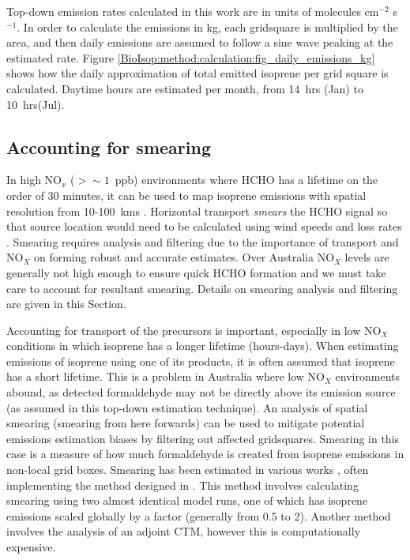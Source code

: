     Top-down emission rates calculated in this work are in units of molecules cm$^{-2}$ s$^{-1}$.
    In order to calculate the emissions in kg, each gridsquare is multiplied by the area, and then daily emissions are assumed to follow a sine wave peaking at the estimated rate.
    Figure \ref{BioIsop:method:calculation:fig_daily_emissions_kg} shows how the daily approximation of total emitted isoprene per grid square is calculated. 
    Daytime hours are estimated per month, from 14~hrs (Jan) to 10~hrs(Jul).
    
    
  
  \subsection{Accounting for smearing}
    \label{BioIsop:method:smearing}
    
    In high NO$_x$ ($ > \sim 1 $~ppb) environments where HCHO has a lifetime on the order of 30 minutes, it can be used to map isoprene emissions with spatial resolution from 10-100~kms \parencite{Palmer2003}.
    Horizontal transport \textit{smears} the HCHO signal so that source location would need to be calculated using wind speeds and loss rates \parencite{Palmer2001,Palmer2003}.
    Smearing requires analysis and filtering due to the importance of transport and NO$_X$ on forming robust and accurate estimates.
    Over Australia NO$_X$ levels are generally not high enough to ensure quick HCHO formation and we must take care to account for resultant smearing.
    Details on smearing analysis and filtering are given in this Section.
    
    Accounting for transport of the precursors is important, especially in low NO$_X$ conditions in which isoprene has a longer lifetime (hours-days).
    When estimating emissions of isoprene using one of its products, it is often assumed that isoprene has a short lifetime.
    This is a problem in Australia where low NO$_X$ environments abound, as detected formaldehyde may not be directly above its emission source (as assumed in this top-down estimation technique).
    An analysis of spatial smearing (smearing from here forwards) can be used to mitigate potential emissions estimation biases by filtering out affected gridsquares.
    Smearing in this case is a measure of how much formaldehyde is created from isoprene emissions in non-local grid boxes.
    Smearing has been estimated in various works \parencite[e.g.][]{Martin2003, Palmer2003, Millet2006, Stavrakou2009, Marais2012, Barkley2013, Zhu2014, Wolfe2016, Surl2018}, often implementing the method designed in \textcite{Palmer2003}.
    This method involves calculating smearing using two almost identical model runs, one of which has isoprene emissions scaled globally by a factor (generally from 0.5 to 2).
    Another method \parencite[e.g.][]{Stavrakou2009} involves the analysis of an adjoint CTM, however this is computationally expensive.
    
